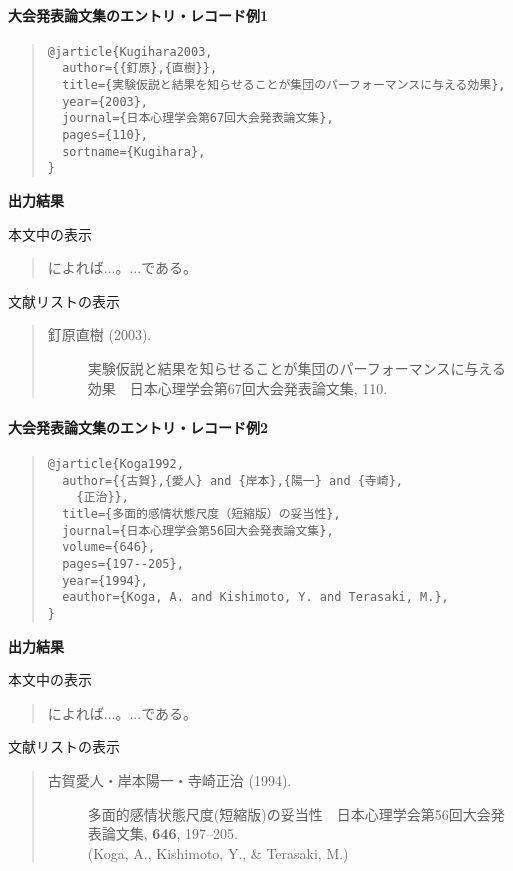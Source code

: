 \documentclass[12pt]{ltjsarticle}
\begin{document}
\paragraph{大会発表論文集のエントリ・レコード例1}

\begin{quote}
\begin{verbatim}
@jarticle{Kugihara2003,
  author={{釘原},{直樹}},
  title={実験仮説と結果を知らせることが集団のパーフォーマンスに与える効果},
  year={2003},
  journal={日本心理学会第67回大会発表論文集},
  pages={110},
  sortname={Kugihara},
}
\end{verbatim}
\end{quote}


\textbf{出力結果}

本文中の表示
\begin{quote}
\textcite{Kugihara2003}によれば...。...である\parencite{Kugihara2003}。
\end{quote}


文献リストの表示
\begin{quote}
\begin{description}
  \item[\textrm{釘原直樹 (2003).}]実験仮説と結果を知らせることが集団のパーフォーマンスに与える効果　日本心理学会第67回大会発表論文集, 110.
\end{description}
\end{quote}

\paragraph{大会発表論文集のエントリ・レコード例2}

\begin{quote}
\begin{verbatim}
@jarticle{Koga1992,
  author={{古賀},{愛人} and {岸本},{陽一} and {寺崎},
    {正治}},
  title={多面的感情状態尺度（短縮版）の妥当性},
  journal={日本心理学会第56回大会発表論文集},
  volume={646},
  pages={197--205},
  year={1994},
  eauthor={Koga, A. and Kishimoto, Y. and Terasaki, M.},
}
\end{verbatim}
\end{quote}


\textbf{出力結果}

本文中の表示
\begin{quote}
\textcite{Koga1992}によれば...。...である\parencite{Koga1992}。
\end{quote}


文献リストの表示
\begin{quote}
\begin{description}
  \item[\textrm{古賀愛人・岸本陽一・寺崎正治 (1994).}]多面的感情状態尺度(短縮版)の妥当性　日本心理学会第56回大会発表論文集, \textbf{646}, 197--205.\\
(Koga, A., Kishimoto, Y., \& Terasaki, M.)
\end{description}
\end{quote}
\end{document}
